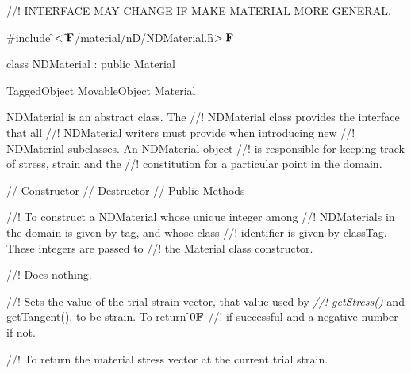 
//! INTERFACE MAY CHANGE IF MAKE MATERIAL MORE GENERAL.

\indent \#include \f$<\tilde{ }{\bf F}$/material/nD/NDMaterial.h\f$>{\bf F}$

\indent class NDMaterial : public Material

\indent TaggedObject
\indent MovableObject
\indent\indent Material
\indent\indent{}

\indent NDMaterial is an abstract class. The
//! NDMaterial class provides the interface that all
//! NDMaterial writers must provide when introducing new
//! NDMaterial subclasses. An NDMaterial object 
//! is responsible for keeping track of stress, strain and the
//! constitution for a particular point in the domain. 

\indent // Constructor
\indent // Destructor
\indent // Public Methods


//! To construct a NDMaterial whose unique integer among
//! NDMaterials in the domain is given by \p tag, and whose class
//! identifier is given by \p classTag. These integers are passed to
//! the Material class constructor.

//! Does nothing. 

//! Sets the value of the trial strain vector, that value used by {\em
//! getStress()} and getTangent(), to be \p strain. To return \f$0{\bf F}$
//! if successful and a negative number if not.

//! To return the material stress vector at the current trial strain.

